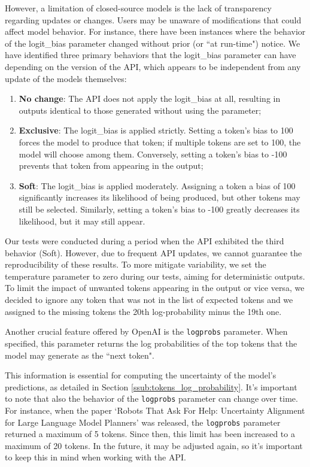 However, a limitation of closed-source models is the lack of transparency
regarding updates or changes. Users may be unaware of modifications that could affect
model behavior. For instance, there have been instances where the behavior of the
logit\_bias parameter changed without prior (or ``at run-time") notice. We have identified
three primary behaviors that the logit\_bias parameter can have depending on the
version of the API, which appears to be independent from any update of the
models themselves:
\begin{enumerate}
  \item \textbf{No change}: The API does not apply the logit\_bias at all,
    resulting in outputs identical to those generated without using the
    parameter;

  \item \textbf{Exclusive}: The logit\_bias is applied strictly. Setting a token's
    bias to 100 forces the model to produce that token; if multiple tokens are set
    to 100, the model will choose among them. Conversely, setting a token's bias
    to -100 prevents that token from appearing in the output;

  \item \textbf{Soft}: The logit\_bias is applied moderately. Assigning a token
    a bias of 100 significantly increases its likelihood of being produced, but other
    tokens may still be selected. Similarly, setting a token's bias to -100
    greatly decreases its likelihood, but it may still appear.
\end{enumerate}

Our tests were conducted during a period when the API exhibited the third
behavior (Soft). However, due to frequent API updates, we cannot guarantee the reproducibility
of these results. To more mitigate variability, we set the temperature parameter
to zero during our tests, aiming for deterministic outputs. To limit the impact of
unwanted tokens appearing in the output or vice versa, we decided to ignore any
token that was not in the list of expected tokens and we assigned to the missing
tokens the 20th log-probability minus the 19th one.

Another crucial feature offered by OpenAI is the \texttt{logprobs} parameter.
When specified, this parameter returns the log probabilities of the top tokens that
the model may generate as the ``next token".

This information is essential for computing the uncertainty of the model's
predictions, as detailed in Section \ref{ssub:tokens_log_probability}. It's
important to note that also the behavior of the \texttt{logprobs} parameter can change
over time. For instance, when the paper `Robots That Ask For Help: Uncertainty Alignment
for Large Language Model Planners' was released, the \texttt{logprobs} parameter
returned a maximum of 5 tokens. Since then, this limit has been increased to a
maximum of 20 tokens. In the future, it may be adjusted again, so it's important
to keep this in mind when working with the API.


